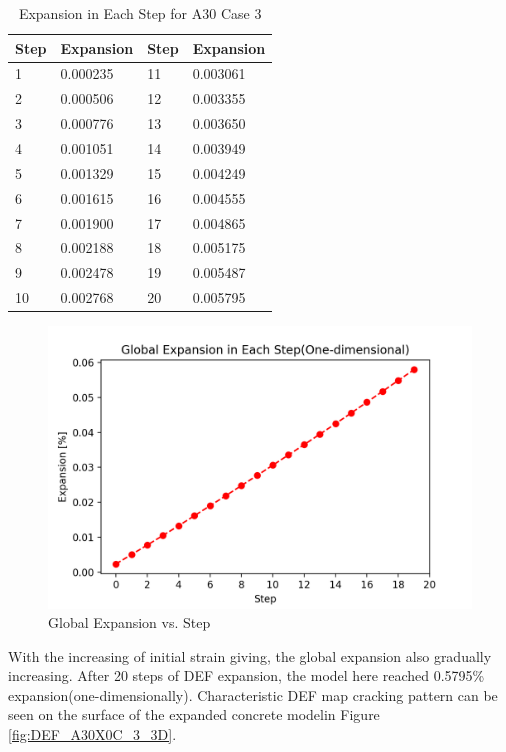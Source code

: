 
  \begin{table}[ht!]
    \caption{Expansion in Each Step for A30 Case 3}
  \centering
  \begin{tabular}{ ||p{3cm}|p{3cm}||p{3cm}|p{3cm}|| }
  \hline
   Step &  Expansion & Step & Expansion \\
   \hline\hline
    1 & 0.000235  & 11 & 0.003061 \\
    2 & 0.000506  & 12 & 0.003355 \\
    3 & 0.000776  & 13 & 0.003650 \\
    4 & 0.001051  & 14 & 0.003949 \\
    5 & 0.001329  & 15 & 0.004249 \\
    6 & 0.001615  & 16 & 0.004555 \\
    7 & 0.001900  & 17 & 0.004865 \\
    8 & 0.002188  & 18 & 0.005175 \\
    9 & 0.002478  & 19 & 0.005487 \\
    10 & 0.002768 & 20  & 0.005795 \\
    \hline
    \end{tabular}

  \label{table:A30X0C_3_EXsP}
  \end{table}

  \begin{figure}[ht!]
  \centering
  \includegraphics[width=.8\linewidth]{Files/exp_plot/DEFA30X0C_3_exp.png}
    \caption{Global Expansion vs. Step}
    \label{fig:DEFA30X0C_3_expvvvv}
  \end{figure}

With the increasing of initial strain giving, the global expansion also gradually increasing. After 20 steps of DEF expansion, the model here reached 0.5795\% expansion(one-dimensionally). Characteristic DEF map cracking pattern can be seen on the surface of the expanded concrete modelin Figure \ref{fig:DEF_A30X0C_3_3D}.

